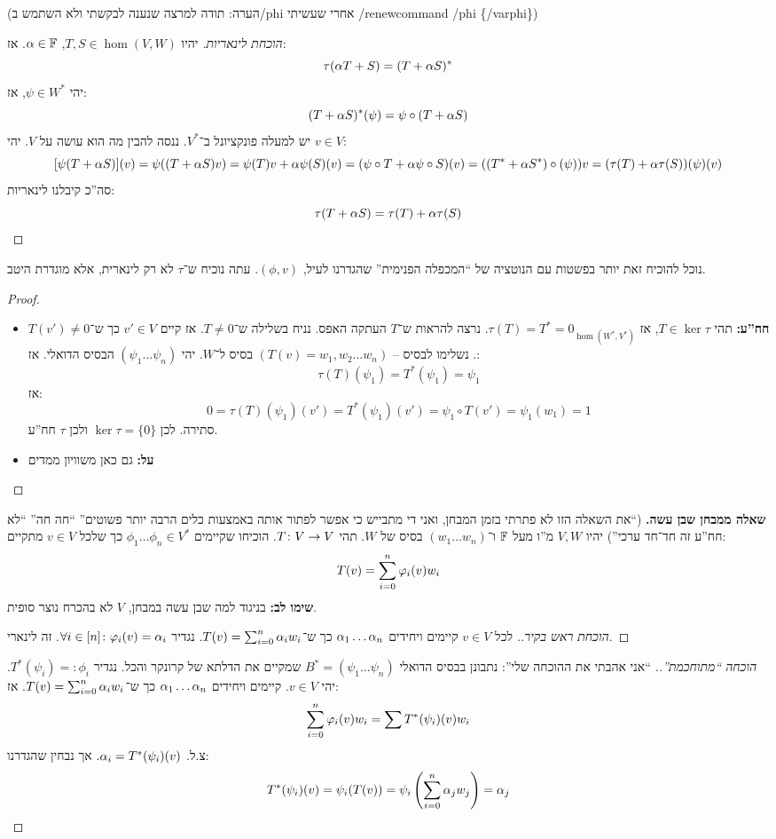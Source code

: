 \documentclass[]{../../../../tex/classes/styledArticle}
\begin{document}
	(הערה: תודה למרצה שנענה לבקשתי ולא השתמש ב\slash phi אחרי שעשיתי \slash renewcommand \slash phi \{\slash varphi\})
	\begin{proof}[הוכחת לינאריות]
		יהיו $T, S \in \hom(V, W)$, $\alpha \in \mathbb{F}$. אז: 
		\[ \tau(\alpha T + S) = (T + \alpha S)^* \]
		יהי $\psi \in W^*$, אז: 
		\[ (T + \alpha S)^*(\psi) = \psi \circ (T + \alpha S) \]
		יש למעלה פונקציונל ב־$V^*$. ננסה להבין מה הוא עושה על $V$. יהי $v \in V$: 
		\[ [\psi (T + \alpha S)](v) = \psi((T + \alpha S)v) = \psi(T)v + \alpha \psi(S)(v) = (\psi\circ T + \alpha \psi\circ S)(v) = ((T^* + \alpha S^*)\circ (\psi))v = (\tau(T) + \alpha \tau(S))(\psi)(v) \]
		סה''כ קיבלנו לינאריות: 
		\[ \tau(T + \alpha S) = \tau(T) + \alpha \tau(S) \]
	\end{proof}
	נוכל להוכיח זאת יותר בפשטות עם הנוטציה של ``המכפלה הפנימית'' שהגדרנו לעיל, $(\phi, v)$. 
	עתה נוכיח ש־$\tau$ לא רק לינארית, אלא מוגדרת היטב. 
	\begin{proof}\,
		\begin{itemize}
			\item \textbf{חח''ע: }תהי $T \in \ker \tau$, אז $\tau(T) = T^* = 0_{\hom(W^*, V^*)}$. נרצה להראות ש־$T$ העתקה האפס. נניח בשלילה ש־$T \neq 0$. אז קיים $v' \in V$ כך ש־$T(v') \neq 0$. נשלימו לבסיס – $(T(v) = w_1, w_2 \dots w_n)$ בסיס ל־$W$. יהי $(\psi_1 \dots \psi_n)$ הבסיס הדואלי. אז:
			\[ \tau(T)(\psi_1) = T^*(\psi_1) = \psi_1  \]
			אז: 
			\[ 0 = \tau(T)(\psi_1)(v') = T^*(\psi_1)(v') = \psi_1 \circ T(v') = \psi_1(w_1) = 1 \]
			סתירה. לכן $\ker \tau = \{0\}$ ולכן $\tau$ חח''ע. 
			\item \textbf{על: }גם כאן משוויון ממדים
		\end{itemize}
	\end{proof}
	
	\textbf{שאלה ממבחן שבן עשה. }(``את השאלה הזו לא פתרתי בזמן המבחן, ואני די מתבייש כי אפשר לפתור אותה באמצעות כלים הרבה יותר פשוטים'' ``חה חה'' ``לא חח''ע זה חד־חד ערכי'') יהיו $V, W$ מ''ו מעל $\mathbb{F}$ ו־$(w_1 \dots w_n)$ בסיס של $W$. תהי $T \colon V \to V$. הוכיחו שקיימים $\phi_1 \dots \phi_n \in V^*$ כך שלכל $v \in V$ מתקיים: 
	\[ T(v) = \sum_{i = 0}^{n} \varphi_i(v) w_i \]
	\textbf{שימו לב: }בניגוד למה שבן עשה במבחן, $V$ לא בהכרח נוצר סופית. 
	\begin{proof}[הוכחת ראש בקיר.]
		לכל $v \in V$ קיימים ויחידים $\alpha_1 \dots \alpha_n$ כך ש־$T(v) = \sum_{i = 0}^{n} \alpha_i w_i$. נגדיר $\forall i \in [n] \colon \varphi_i(v) = \alpha_i$. זה לינארי. 
	\end{proof}
	
	\begin{proof}[הוכחה ``מתוחכמת''.]
		``אני אהבתי את ההוכחה שלי'': נתבונן בבסיס הדואלי $B^* = (\psi_1 \dots \psi_n)$ שמקיים את הדלתא של קרונקר והכל. 
		נגדיר $T^*(\psi_i) =: \phi_i$. יהי $v \in V$. קיימים ויחידים $\alpha_1 \dots \alpha_n$ כך ש־$T(v) = \sum_{i = 0}^{n} \alpha_i w_i$. אז: 
		\[ \sum_{i = 0}^{n} \varphi_i(v)w_i = \sum T^*(\psi_i)(v) w_i \]
		צ.ל. $\alpha_i = T^*(\psi_i)(v)$. אך נבחין שהגדרנו: 
		\[ T^*(\psi_i)(v) = \psi_i(T(v)) = \psi_i\left ( \sum_{i = 0}^{n} \alpha_j w_j \right ) = \alpha_j \]
		
	\end{proof}
	
\end{document}
